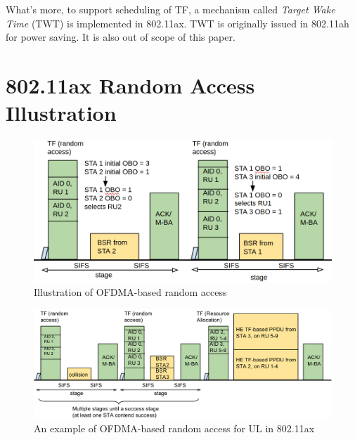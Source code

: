 \documentclass[journal]{IEEEtran}
\begin{document}
What's more, to support scheduling of TF, a mechanism called \textit{Target Wake Time} (TWT) is implemented in 802.11ax. TWT is originally issued in 802.11ah for power saving\cite{khorov2015survey}. It is also out of scope of this paper.



\section{802.11ax Random Access Illustration}		\label{sec_RA_illu}
\begin{figure}[!hb]
\centering
\includegraphics[scale=0.35]{./figure/RA_illu.png}
\caption{Illustration of OFDMA-based random access}
\label{fig_ra_illu}
\end{figure}



\begin{figure}[!hb]
\centering
\includegraphics[scale=0.35]{./figure/RA_illu_2.png}
\caption{An example of OFDMA-based random access for UL in 802.11ax }
\label{fig_ra_ul}
\end{figure}
\end{document}
